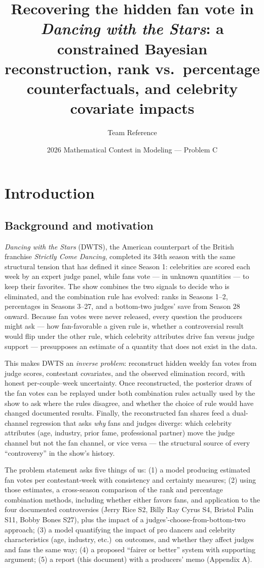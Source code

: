\documentclass[11pt]{article}
\title{Recovering the hidden fan vote in \emph{Dancing with the Stars}: a
constrained Bayesian reconstruction, rank vs.\ percentage counterfactuals, and
celebrity covariate impacts}
\author{Team Reference}
\date{2026 Mathematical Contest in Modeling --- Problem C}
\begin{document}
\maketitle
\tableofcontents
\newpage

\section{Introduction}
\subsection{Background and motivation}
\label{sec:intro}

\emph{Dancing with the Stars} (DWTS), the American counterpart of the British franchise
\emph{Strictly Come Dancing}, completed its 34th season with the same structural tension
that has defined it since Season 1: celebrities are scored each week by an expert judge
panel, while fans vote --- in unknown quantities --- to keep their favorites. The show
combines the two signals to decide who is eliminated, and the combination rule has
evolved: ranks in Seasons 1--2, percentages in Seasons 3--27, and a bottom-two judges'
save from Season 28 onward. Because fan votes were never released, every question the
producers might ask --- how fan-favorable a given rule is, whether a controversial
result would flip under the other rule, which celebrity attributes drive fan versus
judge support --- presupposes an estimate of a quantity that does not exist in the data.

This makes DWTS an \emph{inverse problem}: reconstruct hidden weekly fan votes from judge
scores, contestant covariates, and the observed elimination record, with honest
per-couple--week uncertainty. Once reconstructed, the posterior draws of the fan votes
can be replayed under both combination rules actually used by the show to ask where the
rules disagree, and whether the choice of rule would have changed documented results.
Finally, the reconstructed fan shares feed a dual-channel regression that asks \emph{why}
fans and judges diverge: which celebrity attributes (age, industry, prior fame,
professional partner) move the judge channel but not the fan channel, or vice versa ---
the structural source of every ``controversy'' in the show's history.

The problem statement asks five things of us: (1) a model producing estimated fan votes
per contestant-week with consistency and certainty measures; (2) using those estimates,
a cross-season comparison of the rank and percentage combination methods, including
whether either favors fans, and application to the four documented controversies
(Jerry Rice S2, Billy Ray Cyrus S4, Bristol Palin S11, Bobby Bones S27), plus the
impact of a judges'-choose-from-bottom-two approach; (3) a model quantifying the impact
of pro dancers and celebrity characteristics (age, industry, etc.)\ on outcomes, and
whether they affect judges and fans the same way; (4) a proposed ``fairer or better''
system with supporting argument; (5) a report (this document) with a producers' memo
(Appendix A).
\end{document}
